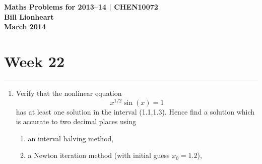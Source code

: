 \documentclass[11pt,a4paper]{article}
\begin{document}
\begin{center} 
{\bf Maths Problems for 2013--14 | CHEN10072 \\
Bill Lionheart\\
 March 2014}
\end{center}

\section*{Week 22}
\hrule
\smallskip


\begin{enumerate}
\item\label{qdjsn1} 
Verify that the nonlinear equation 
$${x}^{1/2} \sin (x) = 1$$ has at
least one solution in the interval (1.1,1.3). Hence find a solution  
which is accurate to two decimal places using
\begin{enumerate}
\item an interval halving method,
\item a Newton iteration method (with initial guess $x_0 = 1.2$),
\end{enumerate}


\end{enumerate}
\end{document}
